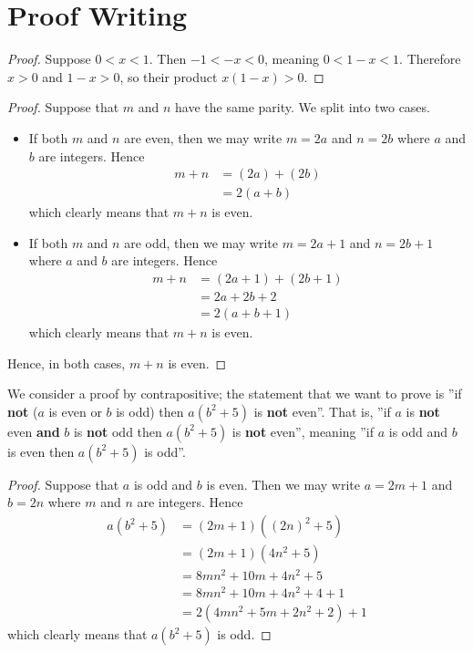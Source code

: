 \section{Proof Writing}
\begin{questions}
    \item \begin{proof}
        Suppose $0 < x < 1$. Then $-1 < -x < 0$, meaning $0 < 1 - x < 1$. Therefore $x > 0$ and $1-x > 0$, so their product $x(1-x) > 0$.
    \end{proof}

    \item \begin{proof}
        Suppose that $m$ and $n$ have the same parity. We split into two cases.
        \begin{itemize}
            \item If both $m$ and $n$ are even, then we may write $m = 2a$ and $n = 2b$ where $a$ and $b$ are integers. Hence
            \begin{align*}
                m + n &= (2a) + (2b) \\
                &= 2(a+b)
            \end{align*}
            which clearly means that $m + n$ is even.
            \item If both $m$ and $n$ are odd, then we may write $m = 2a + 1$ and $n = 2b + 1$ where $a$ and $b$ are integers. Hence
            \begin{align*}
                m + n &= (2a + 1) + (2b + 1)\\
                &= 2a + 2b + 2\\
                &= 2(a + b + 1)
            \end{align*}
            which clearly means that $m+n$ is even.
        \end{itemize}
    Hence, in both cases, $m + n$ is even.
    \end{proof}

    \item We consider a proof by contrapositive; the statement that we want to prove is ''if \textbf{not} ($a$ is even or $b$ is odd) then $a(b^2+5)$ is \textbf{not} even''. That is, ''if $a$ is \textbf{not} even \textbf{and} $b$ is \textbf{not} odd then $a(b^2+5)$ is \textbf{not} even'', meaning ''if $a$ is odd and $b$ is even then $a(b^2+5)$ is odd''.

    \begin{proof}
        Suppose that $a$ is odd and $b$ is even. Then we may write $a = 2m + 1$ and $b = 2n$ where $m$ and $n$ are integers. Hence
        \begin{align*}
            a(b^2+5) &= (2m+1)\left((2n)^2 + 5\right)\\
            &= (2m+1)(4n^2 + 5)\\
            &= 8mn^2 + 10m + 4n^2 + 5\\
            &= 8mn^2 + 10m + 4n^2 + 4 + 1\\
            &= 2(4mn^2 + 5m + 2n^2 + 2) + 1
        \end{align*}
    which clearly means that $a(b^2+5)$ is odd.
    \end{proof}


\end{questions}
